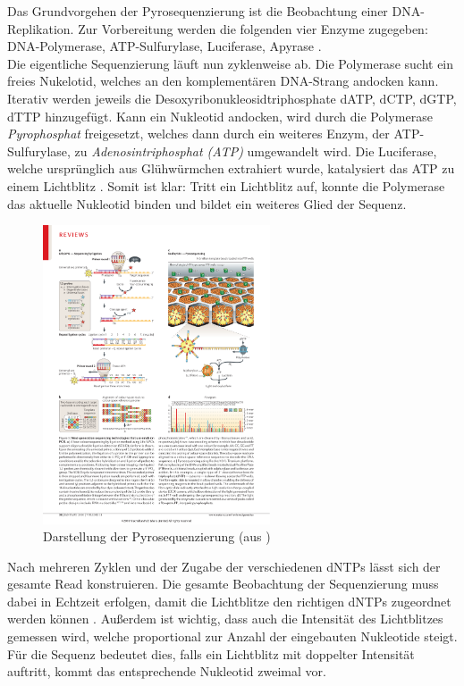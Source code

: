Das Grundvorgehen der Pyrosequenzierung ist die Beobachtung einer DNA-Replikation. Zur Vorbereitung werden die folgenden vier Enzyme zugegeben: DNA-Polymerase, ATP-Sulfurylase, Luciferase, Apyrase \citep{Ahmadian2006}. \\
Die eigentliche Sequenzierung läuft nun zyklenweise ab. Die Polymerase sucht ein freies Nukelotid, welches an den komplementären DNA-Strang andocken kann. Iterativ werden jeweils die Desoxyribonukleosidtriphosphate dATP, dCTP, dGTP, dTTP hinzugefügt. Kann ein Nukleotid andocken, wird durch die Polymerase \textit{Pyrophosphat} freigesetzt, welches dann durch ein weiteres Enzym, der ATP-Sulfurylase, zu \textit{Adenosintriphosphat (ATP)} umgewandelt wird. Die Luciferase, welche ursprünglich aus Glühwürmchen extrahiert wurde, katalysiert das ATP zu einem Lichtblitz \citep{Ahmadian2006}. Somit ist klar: Tritt ein Lichtblitz auf, konnte die Polymerase das aktuelle Nukleotid binden und bildet ein weiteres Glied der Sequenz. 
\begin{figure}[H]
	\begin{center}
		\includegraphics[width=0.6\textwidth]{bilder/Sequenzierung_Pyro_Schema}
	\end{center}
	\caption{Darstellung der Pyrosequenzierung (aus \citet{Metzker2010})}
	\label{fig:bio:seq:pyro:schema}
\end{figure}
Nach mehreren Zyklen und der Zugabe der verschiedenen dNTPs lässt sich der gesamte Read konstruieren. Die gesamte Beobachtung der Sequenzierung muss dabei in Echtzeit erfolgen, damit die Lichtblitze den richtigen dNTPs zugeordnet werden können \citep{Shendure2008}. Außerdem ist wichtig, dass auch die Intensität des Lichtblitzes gemessen wird, welche proportional zur Anzahl der eingebauten Nukleotide steigt. Für die Sequenz bedeutet dies, falls ein Lichtblitz mit doppelter Intensität auftritt, kommt das entsprechende Nukleotid zweimal vor. 
